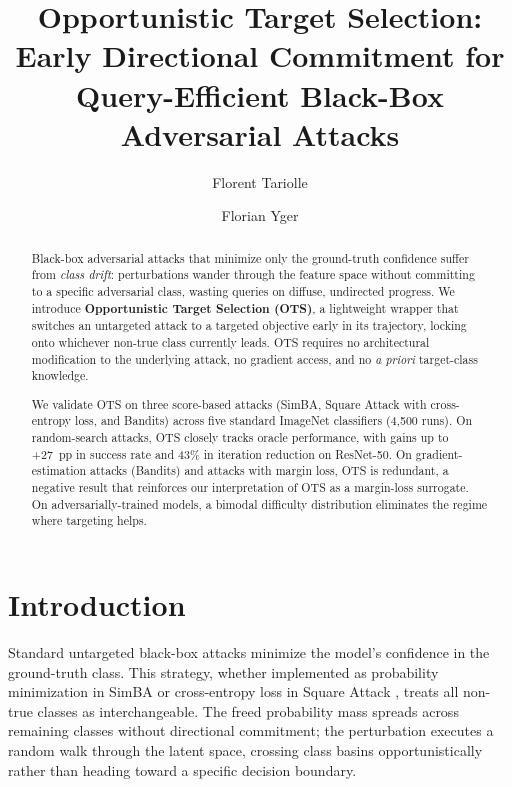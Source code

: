 \documentclass{cap2026}
\title{Opportunistic Target Selection: Early Directional Commitment for Query-Efficient Black-Box Adversarial Attacks}
\author[1]{Florent Tariolle}
\author[1]{Florian Yger}
\affil[1]{INSA Rouen Normandie}
\begin{document}
\maketitle

\begin{abstract}
Black-box adversarial attacks that minimize only the ground-truth confidence suffer from \textit{class drift}: perturbations wander through the feature space without committing to a specific adversarial class, wasting queries on diffuse, undirected progress. We introduce \textbf{Opportunistic Target Selection (OTS)}, a lightweight wrapper that switches an untargeted attack to a targeted objective early in its trajectory, locking onto whichever non-true class currently leads. OTS requires no architectural modification to the underlying attack, no gradient access, and no \textit{a priori} target-class knowledge.

We validate OTS on three score-based attacks (SimBA, Square Attack with cross-entropy loss, and Bandits) across five standard ImageNet classifiers (4,500 runs). On random-search attacks, OTS closely tracks oracle performance, with gains up to +27~pp in success rate and 43\% in iteration reduction on ResNet-50. On gradient-estimation attacks (Bandits) and attacks with margin loss, OTS is redundant, a negative result that reinforces our interpretation of OTS as a margin-loss surrogate. On adversarially-trained models, a bimodal difficulty distribution eliminates the regime where targeting helps.

\medskip
{}
\end{abstract}

\section{Introduction}\label{sec:introduction}

Standard untargeted black-box attacks minimize the model's confidence in the ground-truth class. This strategy, whether implemented as probability minimization in SimBA \citep{guo2019simple} or cross-entropy loss in Square Attack \citep{andriushchenko2020square}, treats all non-true classes as interchangeable. The freed probability mass spreads across remaining classes without directional commitment; the perturbation executes a random walk through the latent space, crossing class basins opportunistically rather than heading toward a specific decision boundary.
\end{document}
